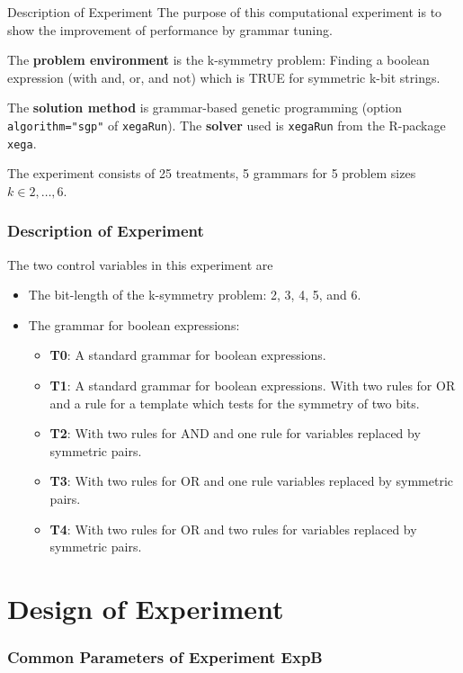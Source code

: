 \documentclass[18pt,c]{beamer}
\makeatletter
\let\beamer@writeslidentry@miniframeson=\beamer@writeslidentry
\newcommand*{\miniframeson}{\let\beamer@writeslidentry=\beamer@writeslidentry@miniframeson}
\makeatother
\begin{document}
\begin{frame}
\vspace*{2mm}
\begin{block}{
Description of Experiment
}
The purpose of this computational experiment is to show the improvement
of performance by grammar tuning.
 
The {\bf problem environment} is the k-symmetry problem: 
Finding a boolean expression (with and, or, and not)
which is TRUE for symmetric k-bit strings.
 
The {\bf solution method} is grammar-based genetic programming
(option {\tt algorithm="sgp"}  of {\tt xegaRun}).
The {\bf solver} used is {\tt xegaRun} from the R-package {\tt xega}.
 
The experiment consists of 25 treatments, 5 grammars for 5 problem sizes $k\in 2,\dots, 6$.
\end{block}
\end{frame}%
\begin{frame}
\frametitle{
Description of Experiment
}
The two control variables in this experiment are
\begin{itemize}
\item The bit-length of the k-symmetry problem: 2, 3, 4, 5, and 6.
\item The grammar for boolean expressions:
\begin{itemize} 
\item {\bf T0}: A standard grammar for boolean expressions.
\item {\bf T1}: A standard grammar for boolean expressions.
            With two rules for OR and a rule for a template 
            which tests for the symmetry of two bits.
\item {\bf T2}: With two rules for AND and one rule for variables replaced
            by symmetric pairs.
\item {\bf T3}: With two rules for OR and one rule variables replaced
            by symmetric pairs.
\item {\bf T4}: With two rules for OR and two rules for variables replaced
            by symmetric pairs.
\end{itemize}
\end{itemize}
\end{frame}%
\miniframeson
\section{Design of Experiment}
 \begin{frame}
 \fontsize{8pt}{9pt}\selectfont
 \frametitle{ Common Parameters of Experiment ExpB }

 \label{ExpBCommonTable000.tex}  
 \end{frame}
\end{document}
